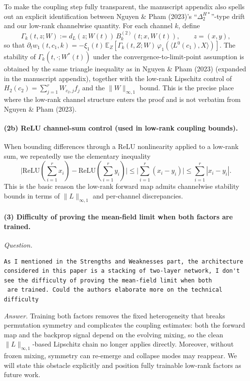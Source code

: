 \documentclass[11pt,a4paper]{article}
\newcommand{\NP}{Nguyen \& Pham (2023)}
\begin{document}
To make the coupling step fully transparent, the manuscript appendix also spells out an explicit identification between \NP{}'s ``$\Delta_2^{H*}$''-type drift and our low-rank channelwise quantity. For each channel $k$, define
\[
\Gamma_k(t,z;W):=d_L(z;W(t))\,B_k^{(2)}(t;x,W(t)),\qquad z=(x,y),
\]
so that $\partial_t w_1(t,c_1,k)=-\xi_1(t)\,\mathbb{E}_Z[\Gamma_k(t,Z;W)\,\varphi_1(\langle L^0(c_1),X\rangle)]$.
The stability of $\Gamma_k(t,\cdot;W^*(t))$ under the convergence-to-limit-point assumption is obtained by the same triangle inequality as in \NP{} (expanded in the manuscript appendix), together with the low-rank Lipschitz control of $H_2(c_2)=\sum_{j=1}^r W_{c_2,j}f_j$ and the $\|W\|_{\infty,1}$ bound. This is the precise place where the low-rank channel structure enters the proof and is not verbatim from \NP{}.

\paragraph{(2b) ReLU channel-sum control (used in low-rank coupling bounds).}
When bounding differences through a ReLU nonlinearity applied to a low-rank sum, we repeatedly use the elementary inequality
\[
\big|\mathrm{ReLU}(\sum_{i=1}^r x_i)-\mathrm{ReLU}(\sum_{i=1}^r y_i)\big|
\le \big|\sum_{i=1}^r (x_i-y_i)\big|
\le \sum_{i=1}^r |x_i-y_i|.
\]
This is the basic reason the low-rank forward map admits channelwise stability bounds in terms of $\|L\|_{\infty,1}$ and per-channel discrepancies.

\paragraph{(3) Difficulty of proving the mean-field limit when both factors are trained.}
\textit{Question.}\par
\begin{verbatim}
As I mentioned in the Strengths and Weaknesses part, the architecture considered in this paper is a stacking of two-layer network, I don't see the difficulty of proving the mean-field limit when both 
 are trained. Could the authors elaborate more on the technical difficulty
\end{verbatim}
\textit{Answer.} Training both factors removes the fixed heterogeneity that breaks permutation symmetry and complicates the coupling estimates: both the forward map and the backprop signal depend on the evolving mixing, so the clean $\|L\|_{\infty,1}$-based Lipschitz chain no longer applies directly. Moreover, without frozen mixing, symmetry can re-emerge and collapse modes may reappear. We will state this obstacle explicitly and position fully trainable low-rank factors as future work.
\end{document}
